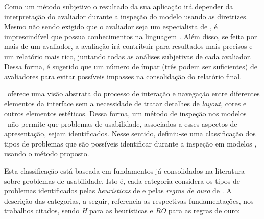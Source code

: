 Como um método subjetivo o  resultado da sua aplicação irá depender da
interpretação  do avaliador  durante a  inspeção do  modelo  usando as
diretrizes.   Mesmo  não  sendo   exigido  que  o  avaliador  seja  um
especialista  de \ihc,  é imprescindível  que possua  conhecimentos na
linguagem \aladim.  Além  disso, se feita por mais  de um avaliador, a
avaliação irá contribuir para  resultados mais precisos e um relatório
mais rico,  juntando todas as  análises subjetivas de  cada avaliador.
Dessa  forma,  é sugerido  que  um número  de  ímpar  (três podem  ser
suficientes)  de   avaliadores  para  evitar   possíveis  impasses  na
consolidação do relatório final.

\aladim\  oferece  uma  visão  abstrata  do processo  de  interação  e
navegação entre diferentes elementos da interface sem a necessidade de
tratar detalhes  de {\em layout}, cores e  outros elementos estéticos.
Dessa forma,  um método de  inspeção nos modelos \aladim\  não permite
que  problemas   de  usabilidade,  associados  a   esses  aspectos  de
apresentação,  sejam  identificados.   Nesse sentido,  definiu-se  uma
classificação  dos tipos  de problemas  que são  possíveis identificar
durante a inspeção em modelos \aladim, usando o método proposto.

Esta  classificação está  baseada  em fundamentos  já consolidados  na
literatura  sobre problemas  de  usabilidade. Isto  é, cada  categoria
considera os tipos de  problemas identificados pelas {\em heurísticas}
de     e  pelas  {\em  regras   de  ouro}  de
.  A descrição  das categorias, a seguir,
referencia as respectivas fundamentações, nos trabalhos citados, sendo
{\em H} para as heurísticas e {\em RO} para as regras de ouro:

